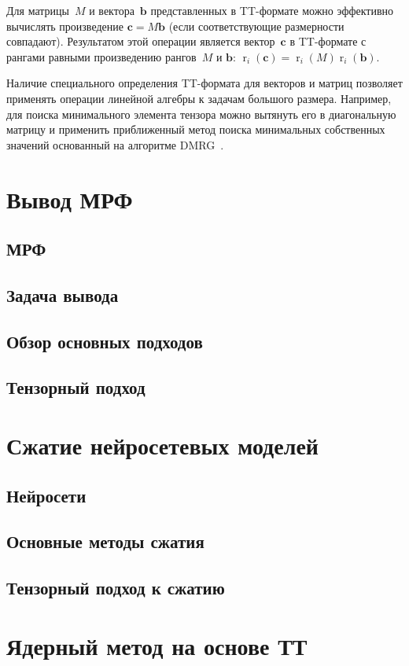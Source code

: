 \documentclass{article} %
\DeclareMathOperator{\rank}{r}
\renewcommand{\vec}[1]{\boldsymbol{#1}}
\begin{document}
Для матрицы~$M$ и вектора~$\vec{b}$ представленных в TT\hyp{}формате можно эффективно вычислять произведение $\vec{c}=M\vec{b}$ (если соответствующие размерности совпадают). Результатом этой операции является вектор~$\vec{c}$ в TT\hyp{}формате с рангами равными произведению рангов~$M$ и $\vec{b}$: $\rank_i(\vec{c}) = \rank_i(M) \rank_i(\vec{b})$.

Наличие специального определения TT\hyp{}формата для векторов и матриц позволяет применять операции линейной алгебры к задачам большого размера. Например, для поиска минимального элемента тензора можно вытянуть его в диагональную матрицу и применить приближенный метод поиска минимальных собственных значений основанный на алгоритме DMRG~\cite{khoromskij2010dmrg}.

\section{Вывод МРФ}
\subsection{МРФ}
\subsection{Задача вывода}
\subsection{Обзор основных подходов}
\subsection{Тензорный подход}
\section{Сжатие нейросетевых моделей}
\subsection{Нейросети}
\subsection{Основные методы сжатия}
\subsection{Тензорный подход к сжатию}
\section{Ядерный метод на основе ТТ}
\end{document}
